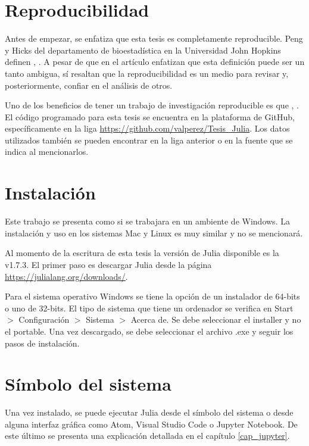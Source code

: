 \section{Reproducibilidad}
Antes de empezar, se enfatiza que esta tesis es completamente reproducible. Peng y Hicks del departamento de bioestadística en la Universidad John Hopkins definen , \cite{peng2021reproducible}. A pesar de que en el artículo enfatizan que esta definición puede ser un tanto ambigua, sí resaltan que la reproducibilidad es un medio para revisar y, posteriormente, confiar en el análisis de otros. 

Uno de los beneficios de tener un trabajo de investigación reproducible es que , \cite{peng2021reproducible}. El código programado para esta tesis se encuentra en la plataforma de GitHub, específicamente en la liga \url{https://github.com/valperez/Tesis_Julia}. Los datos utilizados también se pueden encontrar en la liga anterior o en la fuente que se indica al mencionarlos. 

\section{Instalación}
Este trabajo se presenta como si se trabajara en un ambiente de \textsf{Windows}. La instalación y uso en los sistemas \textsf{Mac} y \textsf{Linux} es muy similar y no se mencionará.  

Al momento de la escritura de esta tesis la versión de \textsf{Julia} disponible es la \textsf{v1.7.3}. El primer paso es descargar \textsf{Julia} desde la página \url{https://julialang.org/downloads/}. 

Para el sistema operativo \textsf{Windows} se tiene la opción de un instalador de 64-bits o uno de 32-bits. El tipo de sistema que tiene un ordenador se verifica en \textsf{Start} $>$ \textsf{Configuración} $>$ \textsf{Sistema} $>$ \textsf{Acerca de}. Se debe seleccionar el \textsf{installer} y no el \textsf{portable}. Una vez descargado, se debe seleccionar el archivo \textsf{.exe} y seguir los pasos de instalación. 

\section{Símbolo del sistema}
Una vez instalado, se puede ejecutar \textsf{Julia} desde el símbolo del sistema o desde alguna interfaz gráfica como \textsf{Atom}, \textsf{Visual Studio Code} o \textsf{Jupyter Notebook}. De este último se presenta una explicación detallada en el capítulo \ref{cap_jupyter}. 

